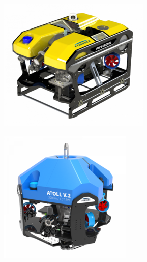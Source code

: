 			\begin{figure}[!htb]
				\centering
				\begin{subfigure}[t]{0.3\textwidth}
					\centering
					\includegraphics[width=\textwidth]{imgs/argos.png}
					\caption{\argos{}}
				\end{subfigure}
				\hfill
				\begin{subfigure}[t]{0.3\textwidth}
					\centering
					\includegraphics[width=\textwidth]{imgs/atoll.png}

\end{subfigure}
\end{figure}

